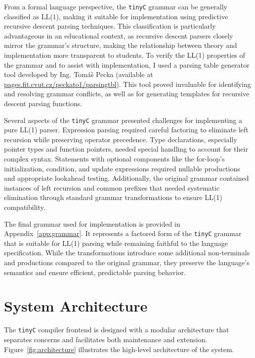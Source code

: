 From a formal language perspective, the \texttt{tinyC} grammar can be generally classified as LL(1), making it suitable for implementation using predictive recursive descent parsing techniques. This classification is particularly advantageous in an educational context, as recursive descent parsers closely mirror the grammar's structure, making the relationship between theory and implementation more transparent to students. To verify the LL(1) properties of the grammar and to assist with implementation, I used a parsing table generator tool developed by Ing. Tomáš Pecka (available at \url{pages.fit.cvut.cz/peckato1/parsingtbl}). This tool proved invaluable for identifying and resolving grammar conflicts, as well as for generating templates for recursive descent parsing functions.

Several aspects of the \texttt{tinyC} grammar presented challenges for implementing a pure LL(1) parser. Expression parsing required careful factoring to eliminate left recursion while preserving operator precedence. Type declarations, especially pointer types and function pointers, needed special handling to account for their complex syntax. Statements with optional components like the for-loop's initialization, condition, and update expressions required nullable productions and appropriate lookahead testing. Additionally, the original grammar contained instances of left recursion and common prefixes that needed systematic elimination through standard grammar transformations to ensure LL(1) compatibility.

The final grammar used for implementation is provided in Appendix~\ref{app:grammar}. It represents a factored form of the \texttt{tinyC} grammar that is suitable for LL(1) parsing while remaining faithful to the language specification. While the transformations introduce some additional non-terminals and productions compared to the original grammar, they preserve the language's semantics and ensure efficient, predictable parsing behavior.

\section{System Architecture}

The \texttt{tinyC} compiler frontend is designed with a modular architecture that separates concerns and facilitates both maintenance and extension. Figure~\ref{fig:architecture} illustrates the high-level architecture of the system.

